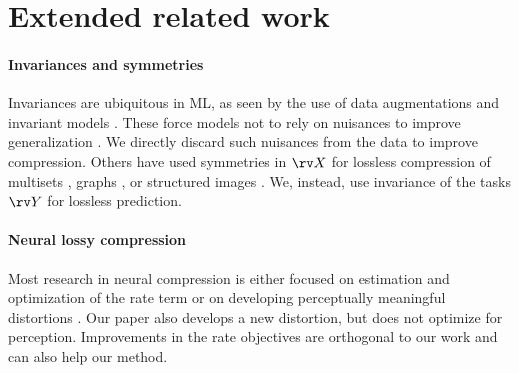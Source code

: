 \documentclass[final]{article}
\begin{document}
\clearpage
\newpage 
\section{Extended related work}
\label{appx:related}
\paragraph{Invariances and symmetries}
 Invariances are ubiquitous in ML, as seen by the use of data augmentations \cite{shorten_survey_2019} and invariant models \cite{shawe-taylor_building_1989,wood_representation_1996,bruna_invariant_2013,cohen_group_2016,zaheer_deep_2017,kondor_generalization_2018,bloem-reddy_probabilistic_2020}.
These force models not to rely on nuisances to improve generalization \cite{dao_kernel_2019,chen_group-theoretic_2020,lyle_benefits_2020}.
We directly discard such nuisances from the data to improve compression.
Others have used symmetries in $\rv X$ for lossless compression of multisets \cite{varshney_benefiting_2007}, graphs \cite{choi_compression_2012,dehmer_history_2011,kontoyiannis_compression_2020}, or structured images \cite{sanchez_symmetry-based_2009,amraee_compression_2011,mitra_symmetry_2013,gnutti_representation_2015,bairagi_symmetry-based_2015}.
We, instead, use invariance of the tasks $\rv Y$ for lossless prediction.

\paragraph{Neural lossy compression}
Most research in neural compression is either focused on estimation and optimization of the rate term \cite{chen_variational_2017,minnen_joint_2018,johnston_computationally_2019,yang_improving_2020,yang_variational_2020,minnen_channel-wise_2020,lee_context-adaptive_2019,agustsson_universally_2020} or on developing perceptually meaningful distortions \cite{blau_rethinking_2019,chen_perceptually_2020,agustsson_generative_2019,mentzer_high-fidelity_2020}.
Our paper also develops a new distortion, but does not optimize for perception.
Improvements in the rate objectives are orthogonal to our work and can also help our method.
\end{document}
